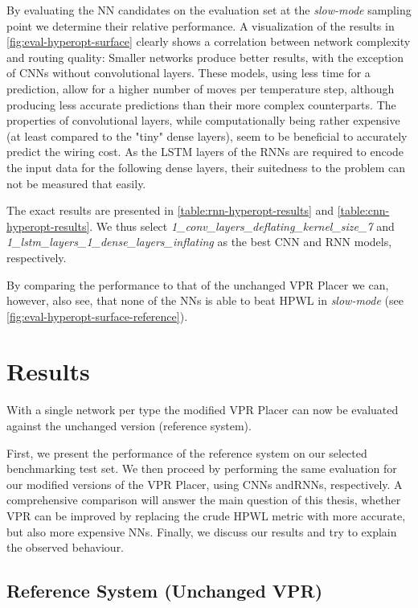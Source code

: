 By evaluating the \gls{NN} candidates on the evaluation set at the \textit{slow-mode} sampling point we determine their relative performance. A visualization of the results in \ref{fig:eval-hyperopt-surface} clearly shows a correlation between network complexity and routing quality: Smaller networks produce better results, with the exception of \glspl{CNN} without convolutional layers. These models, using less time for a prediction, allow for a higher number of moves per temperature step, although producing less accurate predictions than their more complex counterparts. The properties of convolutional layers, while computationally being rather expensive (at least compared to the "tiny" dense layers), seem to be beneficial to accurately predict the wiring cost. As the \gls{LSTM} layers of the \glspl{RNN} are required to encode the input data for the following dense layers, their suitedness to the problem can not be measured that easily.

The exact results are presented in \ref{table:rnn-hyperopt-results} and \ref{table:cnn-hyperopt-results}. We thus select \textit{1\_conv\_layers\_deflating\_kernel\_size\_7} and \textit{1\_lstm\_layers\_1\_dense\_layers\_inflating} as the best \gls{CNN} and \gls{RNN} models, respectively.

By comparing the performance to that of the unchanged \gls{VPR} Placer we can, however, also see, that none of the \glspl{NN} is able to beat \gls{HPWL} in \textit{slow-mode} (see \ref{fig:eval-hyperopt-surface-reference}).

\section{Results}

With a single network per type the modified \gls{VPR} Placer can now be evaluated against the unchanged version (reference system).

First, we present the performance of the reference system on our selected benchmarking test set. We then proceed by performing the same evaluation for our modified versions of the \gls{VPR} Placer, using \glspl{CNN} and\glspl{RNN}, respectively. A comprehensive comparison will answer the main question of this thesis, whether \gls{VPR} can be improved by replacing the crude \gls{HPWL} metric with more accurate, but also more expensive \glspl{NN}. Finally, we discuss our results and try to explain the observed behaviour.

\subsection{Reference System (Unchanged \gls{VPR})}

